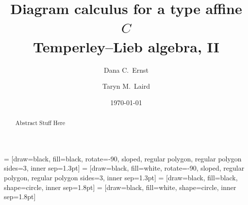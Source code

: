\documentclass[11pt]{amsart}
\date{\today}
\theoremstyle{definition}
\numberwithin{equation}{section}
\renewcommand{\(}{\left(}
\renewcommand{\)}{\right)}
\begin{document}
 = [draw=black, fill=black, rotate=-90, sloped, regular polygon, regular polygon sides=3, inner sep=1.3pt]
 = [draw=black, fill=white, rotate=-90, sloped, regular polygon, regular polygon sides=3, inner sep=1.3pt]
 = [draw=black, fill=black, shape=circle, inner sep=1.8pt]
 = [draw=black, fill=white, shape=circle, inner sep=1.8pt]

\title[Diagram calculus for a type affine $C$ Temperley--Lieb algebra, II]{Diagram calculus for a type affine $C$ \\ Temperley--Lieb algebra, II}

\author[D.C.~Ernst]{Dana C.~Ernst}
\address{Department of Mathematics and Statistics, Northern Arizona University, Flagstaff, AZ 86011}

\author[T.M.~Laird]{Taryn M.~Laird}
\address{Department of Mathematics and Statistics, Northern Arizona University, Flagstaff, AZ 86011}



\begin{abstract}
Abstract Stuff Here
\end{abstract}

\maketitle





\end{document}
